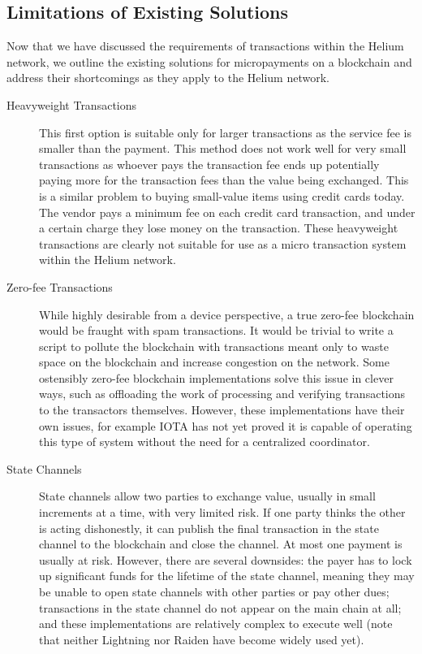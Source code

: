 \documentclass[10pt, nonatbib, nocopyrightspace, reprint]{sigplanconf}
\begin{document}
\subsection{Limitations of Existing Solutions}

Now that we have discussed the requirements of transactions within the Helium network, we outline the existing solutions for micropayments on a blockchain and address their shortcomings as they apply to the Helium network.

\begin{description}

\item [Heavyweight Transactions] This first option is suitable only for larger transactions as the service fee is smaller than the payment. This method does not work well for very small transactions as whoever pays the transaction fee ends up potentially paying more for the transaction fees than the value being exchanged. This is a similar problem to buying small-value items using credit cards today. The vendor pays a minimum fee on each credit card transaction, and under a certain charge they lose money on the transaction. These heavyweight transactions are clearly not suitable for use as a micro transaction system within the Helium network.

\item [Zero-fee Transactions] While highly desirable from a device perspective, a true zero-fee blockchain would be fraught with spam transactions. It would be trivial to write a script to pollute the blockchain with transactions meant only to waste space on the blockchain and increase congestion on the network. Some ostensibly zero-fee blockchain implementations solve this issue in clever ways, such as offloading the work of processing and verifying transactions to the transactors themselves. However, these implementations have their own issues, for example IOTA \cite{iota} has not yet proved it is capable of operating this type of system without the need for a centralized coordinator.

\item [State Channels] State channels \cite{state-channels} allow two parties to exchange value, usually in small increments at a time, with very limited risk. If one party thinks the other is acting dishonestly, it can publish the final transaction in the state channel to the blockchain and close the channel. At most one payment is usually at risk. However, there are several downsides: the payer has to lock up significant funds for the lifetime of the state channel, meaning they may be unable to open state channels with other parties or pay other dues; transactions in the state channel do not appear on the main chain at all; and these implementations are relatively complex to execute well (note that neither Lightning \cite{lightning} nor Raiden \cite{raiden} have become widely used yet).


\end{description}
\end{document}
